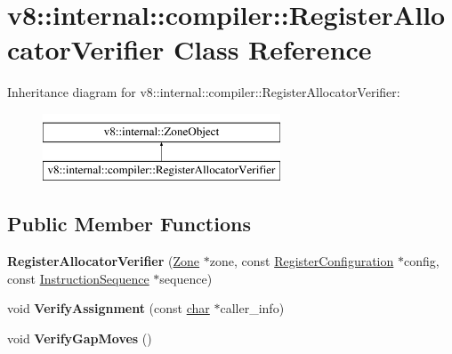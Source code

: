 \hypertarget{classv8_1_1internal_1_1compiler_1_1RegisterAllocatorVerifier}{}\section{v8\+:\+:internal\+:\+:compiler\+:\+:Register\+Allocator\+Verifier Class Reference}
\label{classv8_1_1internal_1_1compiler_1_1RegisterAllocatorVerifier}
Inheritance diagram for v8\+:\+:internal\+:\+:compiler\+:\+:Register\+Allocator\+Verifier\+:\begin{figure}[H]
\begin{center}
\leavevmode
\includegraphics[height=2.000000cm]{classv8_1_1internal_1_1compiler_1_1RegisterAllocatorVerifier}
\end{center}
\end{figure}
\subsection*{Public Member Functions}
\begin{DoxyCompactItemize}
\item 
\mbox{\label{classv8_1_1internal_1_1compiler_1_1RegisterAllocatorVerifier_aef6d8bede5616df7292f7552f785798a}} 
{\bfseries Register\+Allocator\+Verifier} (\mbox{\hyperlink{classv8_1_1internal_1_1Zone}{Zone}} $\ast$zone, const \mbox{\hyperlink{classv8_1_1internal_1_1RegisterConfiguration}{Register\+Configuration}} $\ast$config, const \mbox{\hyperlink{classv8_1_1internal_1_1compiler_1_1InstructionSequence}{Instruction\+Sequence}} $\ast$sequence)
\item 
\mbox{\label{classv8_1_1internal_1_1compiler_1_1RegisterAllocatorVerifier_a49936544e852dc94430c3b3d2f19c138}} 
void {\bfseries Verify\+Assignment} (const \mbox{\hyperlink{classchar}{char}} $\ast$caller\+\_\+info)
\item 
\mbox{\label{classv8_1_1internal_1_1compiler_1_1RegisterAllocatorVerifier_a3243175f280f32d532c39c297cfb23f9}} 
void {\bfseries Verify\+Gap\+Moves} ()
\end{DoxyCompactItemize}


